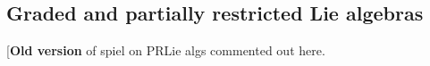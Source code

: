 \documentclass[11pt]{amsart}
\theoremstyle{plain}
\theoremstyle{definition}
\DeclareMathOperator{\im}{im}
\newcommand{\DASH}{\textup{--}}
\renewcommand{\to}{\longrightarrow}
\newcommand{\scrL}{\mathscr{L}}
\newcommand{\calV}{\mathcal{V}}
\theoremstyle{plain}
\newcommand{\LieOperad}{{\scrL}}
\newcommand{\restn}[1]{#1^{[2]}}
\newcommand{\vect}[2]{\calV^{#1}_{#2}}
\begin{document}
\begin{Lie algebras in characteristic 2 and their homotopy operations}
\subsection{Graded and partially restricted Lie algebras}
[\textbf{Old version} of spiel on PRLie algs commented out here.%
%
%

\end{Lie algebras in characteristic 2 and their homotopy operations}
\end{document}
